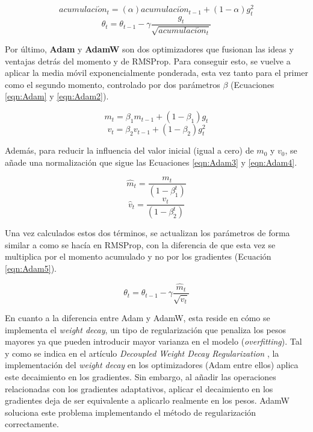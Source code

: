 \begin{equation}
\label{eqn:RMSProp}
acumulaci\acute{o}n_t = (\alpha) acumulaci\acute{o}n_{t-1} + (1-\alpha) g^{2}_{t}
\end{equation}
\begin{equation}
\label{eqn:RMSProp2}
\theta_t = \theta_{t-1} - \gamma \frac{g_t}{\sqrt{acumulaci\acute{o}n_t}}
\end{equation}

Por último, \textbf{Adam} y \textbf{AdamW} son dos optimizadores que fusionan las ideas y ventajas detrás del momento y de RMSProp. Para conseguir esto, se vuelve a aplicar la media móvil exponencialmente ponderada, esta vez tanto para el primer como el segundo momento, controlado por dos parámetros $\beta$ (Ecuaciones \ref{eqn:Adam} y \ref{eqn:Adam2}).

\begin{equation}
\label{eqn:Adam}
m_t = \beta_1 m_{t-1} + (1-\beta_1) g_{t}
\end{equation}
\begin{equation}
\label{eqn:Adam2}
v_t = \beta_2 v_{t-1} + (1-\beta_2) g^{2}_{t}
\end{equation}

Además, para reducir la influencia del valor inicial (igual a cero) de $m_0$ y $v_0$, se añade una normalización que sigue las Ecuaciones \ref{eqn:Adam3} y \ref{eqn:Adam4}.

\begin{equation}
\label{eqn:Adam3}
\hat{m}_t = \frac{m_t}{(1-\beta^{t}_{1})}
\end{equation}
\begin{equation}
\label{eqn:Adam4}
\hat{v}_t = \frac{v_t}{(1-\beta^{t}_{2})}
\end{equation}

Una vez calculados estos dos términos, se actualizan los parámetros de forma similar a como se hacía en RMSProp, con la diferencia de que esta vez se multiplica por el momento acumulado y no por los gradientes (Ecuación \ref{eqn:Adam5}).

\begin{equation}
\label{eqn:Adam5}
\theta_t = \theta_{t-1} - \gamma \frac{\hat{m}_t}{\sqrt{\hat{v}_t}}
\end{equation}

En cuanto a la diferencia entre Adam y AdamW, esta reside en cómo se implementa el \textit{weight decay}, un tipo de regularización que penaliza los pesos mayores ya que pueden introducir mayor varianza en el modelo (\textit{overfitting}). Tal y como se indica en el artículo \textit{Decoupled Weight Decay Regularization} \cite{adamw}, la implementación del \textit{weight decay} en los optimizadores (Adam entre ellos) aplica este decaimiento en los gradientes. Sin embargo, al añadir las operaciones relacionadas con los gradientes adaptativos, aplicar el decaimiento en los gradientes deja de ser equivalente a aplicarlo realmente en los pesos. AdamW soluciona este problema implementando el método de regularización correctamente.

